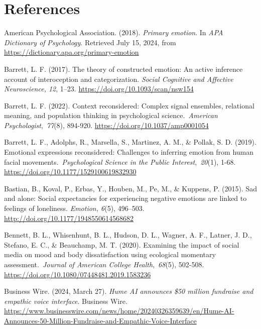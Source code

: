 \documentclass[authordate, reflection,issue]{jote-new-article}
\begin{document}
	\section{References}



	American Psychological Association. (2018). \emph{Primary emotion}. In \emph{APA Dictionary of }\emph{Psychology}. Retrieved July 15, 2024, from \url{https://dictionary.apa.org/primary-emotion}



	Barrett, L. F. (2017). The theory of constructed emotion: An active inference account of interoception and categorization. \emph{Social Cognitive and Affective Neuroscience, 12}, 1--23. \url{https://doi.org/10.1093/scan/nsw154}



	Barrett, L. F. (2022). Context reconsidered: Complex signal ensembles, relational meaning, and population thinking in psychological science. \emph{American Psychologist}, \emph{77}(8), 894-920. \url{https://doi.org/10.1037/amp0001054}



	Barrett, L. F., Adolphs, R., Marsella, S., Martinez, A. M., \& Pollak, S. D. (2019). Emotional expressions reconsidered: Challenges to inferring emotion from human facial movements. \emph{Psychological Science in the Public Interest}, \emph{20}(1), 1-68. \url{https://doi.org/10.1177/1529100619832930}



	Bastian, B., Koval, P., Erbas, Y., Houben, M., Pe, M., \& Kuppens, P. (2015). Sad and alone: Social expectancies for experiencing negative emotions are linked to feelings of loneliness. \emph{Emotion, 6}(5), 496--503. \url{http://doi.org/10.1177/1948550614568682}



	Bennett, B. L., Whisenhunt, B. L., Hudson, D. L., Wagner, A. F., Latner, J. D., Stefano, E. C., \& Beauchamp, M. T. (2020). Examining the impact of social media on mood and body dissatisfaction using ecological momentary assessment. \emph{Journal of American College Health}, \emph{68}(5), 502-508. \url{https://doi.org/10.1080/07448481.2019.1583236}



	Business Wire. (2024, March 27). \emph{Hume AI announces \$50 million fundraise and empathic } \emph{voice interface}. Business Wire. \url{https://www.businesswire.com/news/home/20240326359639/en/Hume-AI-Announces-50-Million-Fundraise-and-Empathic-Voice-Interface}
\end{document}
